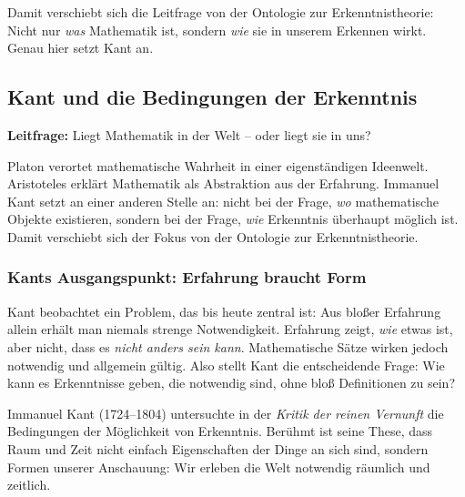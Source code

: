 \medskip

Damit verschiebt sich die Leitfrage von der Ontologie zur Erkenntnistheorie:
Nicht nur \emph{was} Mathematik ist,
sondern \emph{wie} sie in unserem Erkennen wirkt.
Genau hier setzt Kant an.


\subsection{Kant und die Bedingungen der Erkenntnis}
\label{sec:8.3}

\textbf{Leitfrage:} Liegt Mathematik in der Welt -- oder liegt sie in uns?

\medskip

Platon verortet mathematische Wahrheit
in einer eigenständigen Ideenwelt.
Aristoteles erklärt Mathematik
als Abstraktion aus der Erfahrung.
Immanuel Kant setzt an einer anderen Stelle an:
nicht bei der Frage,
\emph{wo} mathematische Objekte existieren,
sondern bei der Frage,
\emph{wie} Erkenntnis überhaupt möglich ist.
Damit verschiebt sich der Fokus von der Ontologie zur Erkenntnistheorie.

\subsubsection*{Kants Ausgangspunkt: Erfahrung braucht Form}

Kant beobachtet ein Problem,
das bis heute zentral ist:
Aus bloßer Erfahrung allein erhält man niemals strenge Notwendigkeit.
Erfahrung zeigt,
\emph{wie} etwas ist,
aber nicht,
dass es \emph{nicht anders sein kann}.
Mathematische Sätze wirken jedoch notwendig und allgemein gültig.
Also stellt Kant die entscheidende Frage:
Wie kann es Erkenntnisse geben,
die notwendig sind,
ohne bloß Definitionen zu sein?

\begin{HistoryBox}
	\label{box:kant-krv}
	\small
	Immanuel Kant (1724--1804) untersuchte in der
	\emph{Kritik der reinen Vernunft}
	die Bedingungen der Möglichkeit von Erkenntnis.
	Berühmt ist seine These,
	dass Raum und Zeit nicht einfach Eigenschaften der Dinge an sich sind,
	sondern Formen unserer Anschauung:
	Wir erleben die Welt notwendig räumlich und zeitlich.
\end{HistoryBox}

